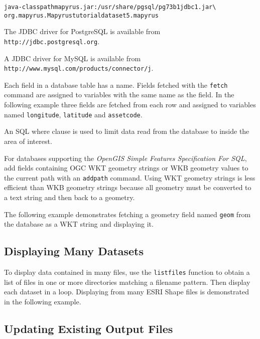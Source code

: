 \begin{alltt}
java -classpath mapyrus.jar:/usr/share/pgsql/pg73b1jdbc1.jar \textbackslash
  org.mapyrus.Mapyrus tutorialdataset5.mapyrus
\end{alltt}

The JDBC driver for PostgreSQL is available from
\texttt{http://jdbc.postgresql.org}.

A JDBC driver for MySQL is available from
\newline
\texttt{http://www.mysql.com/products/connector/j}.

Each field in a database table has a name.
Fields fetched with the
\texttt{fetch}
command are assigned to variables with the same name as the field.
In the following example three fields are fetched from each
row and assigned to variables named
\texttt{longitude}, \texttt{latitude} and \texttt{assetcode}.

An SQL where clause is used to limit data read from
the database to inside the area of interest.



For databases supporting the \textit{OpenGIS Simple Features Specification For
SQL}, add fields containing OGC WKT geometry strings or WKB geometry values
to the current path with an \texttt{addpath} command.  Using WKT geometry
strings is less efficient than WKB geometry strings because all geometry
must be converted to a text string and then back to a geometry.

The following example demonstrates fetching a geometry field named \texttt{geom}
from the database as a WKT string and displaying it.



\subsection{Displaying Many Datasets}

To display data contained in many files, use the \texttt{listfiles}
function to obtain a list of files in one or more directories matching
a filename pattern.  Then display each dataset in a loop.
Displaying from many ESRI Shape files is demonstrated in the following
example.



\subsection{Updating Existing Output Files}

